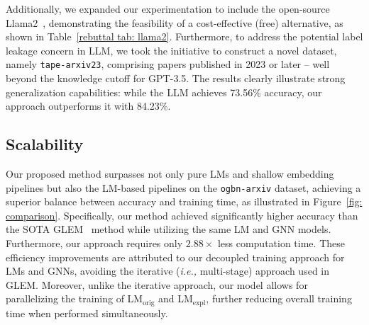 \documentclass{article}
\newcommand{\ie}{\emph{i.e.,}\xspace}
\begin{document}
Additionally, we expanded our experimentation to include the open-source Llama2~\citep{touvron2023llama}, demonstrating the feasibility of a cost-effective (free) alternative, as shown in Table~\ref{rebuttal tab: llama2}. Furthermore, to address the potential label leakage concern in LLM, we took the initiative to construct a novel dataset, namely \texttt{tape-arxiv23}, comprising papers published in 2023 or later -- well beyond the knowledge cutoff for GPT-3.5. The results clearly illustrate strong generalization capabilities: while the LLM achieves 73.56\% accuracy, our approach outperforms it with 84.23\%. 

\subsection{Scalability}

Our proposed method surpasses not only pure LMs and shallow embedding pipelines but also the LM-based pipelines on the \texttt{ogbn-arxiv} dataset, achieving a superior balance between accuracy and training time, as illustrated in Figure~\ref{fig: comparison}. Specifically, our method achieved significantly higher accuracy than the SOTA GLEM~\citep{zhao2022learning_em} method while utilizing the same LM and GNN models. Furthermore, our approach requires only $2.88\times$ less computation time. These efficiency improvements are attributed to our decoupled training approach for LMs and GNNs, avoiding the iterative (\ie multi-stage) approach used in GLEM. Moreover, unlike the iterative approach, our model allows for parallelizing the training of LM$_\textrm{orig}$ and LM$_\textrm{expl}$, further reducing overall training time when performed simultaneously. 
\end{document}
